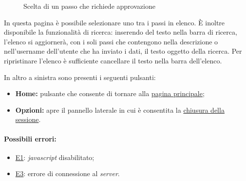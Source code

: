 \begin{figure}[H] \centering 
{} \caption{Scelta di un passo che richiede approvazione}
\label{fig:Fcheckstep}
\end{figure}

In questa pagina è possibile selezionare uno tra i passi in elenco. È inoltre disponibile la funzionalità di ricerca: inserendo del testo nella barra di ricerca, l'elenco si aggiornerà, con i soli passi che contengono nella descrizione o nell'username dell'utente che ha inviato i dati, il testo oggetto della ricerca.
Per ripristinare l'elenco è sufficiente cancellare il testo nella barra dell'elenco.

In altro a sinistra sono presenti i seguenti pulsanti:
\begin{itemize}
\item \textbf{Home:} pulsante che consente di tornare alla \hyperref[home]{pagina principale};
\item \textbf{Opzioni:} apre il pannello laterale in cui è consentita la \hyperref[logout]{chiusura della sessione}.
\end{itemize}

\paragraph*{Possibili errori:}
\begin{itemize}
\item \hyperref[e1]{E1}: \textit{javascript} disabilitato;
\item \hyperref[e3]{E3}: errore di connessione al \textit{server}.
\end{itemize}

